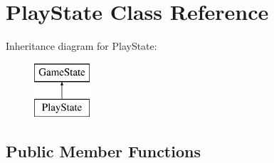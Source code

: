 \hypertarget{class_play_state}{}\section{Play\+State Class Reference}
\label{class_play_state}
Inheritance diagram for Play\+State\+:\begin{figure}[H]
\begin{center}
\leavevmode
\includegraphics[height=2.000000cm]{class_play_state}
\end{center}
\end{figure}
\subsection*{Public Member Functions}
